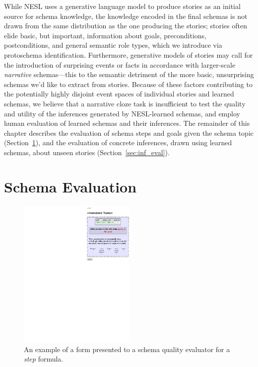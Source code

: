 While NESL uses a generative language model to produce stories as an initial source for schema knowledge, the knowledge encoded in the final schemas is not drawn from the same distribution as the one producing the stories; stories often elide basic, but important, information about goals, preconditions, postconditions, and general semantic role types, which we introduce via protoschema identification. Furthermore, generative models of stories may call for the introduction of surprising events or facts in accordance with larger-scale \textit{narrative} schemas---this to the semantic detriment of the more basic, unsurprising schemas we'd like to extract from stories. Because of these factors contributing to the potentially highly disjoint event spaces of individual stories and learned schemas, we believe that a narrative cloze task is insufficient to test the quality and utility of the inferences generated by NESL-learned schemas, and employ human evaluation of learned schemas and their inferences. The remainder of this chapter describes the evaluation of schema steps and goals given the schema topic (Section~\ref{sec:schema_eval}), and the evaluation of concrete inferences, drawn using learned schemas, about unseen stories (Section~\ref{sec:inf_eval}).

\section{Schema Evaluation}
\label{sec:schema_eval}

\begin{figure}
    \centering
    \includegraphics[width=0.5\textwidth]{CH4_learning/evaleg3.pdf}
    \caption{An example of a form presented to a schema quality evaluator for a \textit{step} formula.}
    \label{fig:step_eval_eg}
\end{figure}

